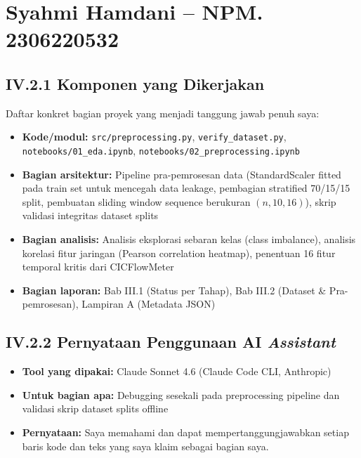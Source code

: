 \documentclass[11pt,a4paper,oneside]{report}
\begin{document}
\section{Syahmi Hamdani -- NPM. 2306220532}

\subsection*{IV.2.1 Komponen yang Dikerjakan}
Daftar konkret bagian proyek yang menjadi tanggung jawab penuh saya:
\begin{itemize}[leftmargin=*]
    \item \textbf{Kode/modul:} \texttt{src/preprocessing.py}, \texttt{verify\_dataset.py}, \texttt{notebooks/01\_eda.ipynb}, \texttt{notebooks/02\_preprocessing.ipynb}
    \item \textbf{Bagian arsitektur:} Pipeline pra-pemrosesan data (StandardScaler fitted pada train set untuk mencegah data leakage, pembagian stratified 70/15/15 split, pembuatan sliding window sequence berukuran $(n, 10, 16)$), skrip validasi integritas dataset splits
    \item \textbf{Bagian analisis:} Analisis eksplorasi sebaran kelas (class imbalance), analisis korelasi fitur jaringan (Pearson correlation heatmap), penentuan 16 fitur temporal kritis dari CICFlowMeter
    \item \textbf{Bagian laporan:} Bab III.1 (Status per Tahap), Bab III.2 (Dataset \& Pra-pemrosesan), Lampiran A (Metadata JSON)
\end{itemize}

\subsection*{IV.2.2 Pernyataan Penggunaan AI \textit{Assistant}}
\begin{itemize}[leftmargin=*]
    \item \textbf{Tool yang dipakai:} Claude Sonnet 4.6 (Claude Code CLI, Anthropic)
    \item \textbf{Untuk bagian apa:} Debugging sesekali pada preprocessing pipeline dan validasi skrip dataset splits offline
    \item \textbf{Pernyataan:} Saya memahami dan dapat mempertanggungjawabkan setiap baris kode dan teks yang saya klaim sebagai bagian saya.
\end{itemize}

\end{document}
